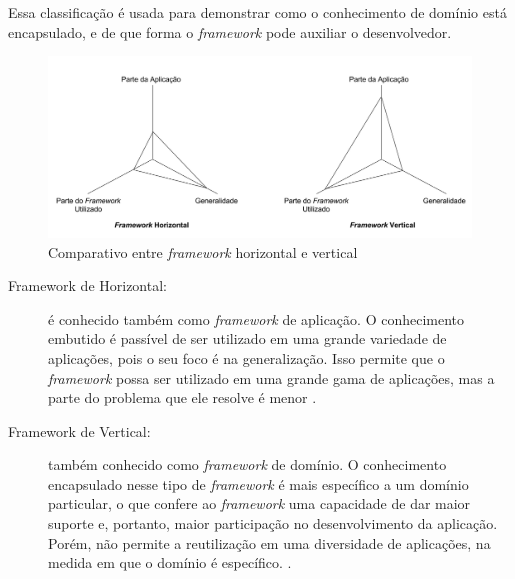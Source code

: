 Essa classificação é usada para demonstrar como o conhecimento de domínio está
encapsulado, e de que forma o \textit{framework} pode auxiliar o desenvolvedor.
\begin{figure}[h]
    \centering
    \includegraphics[width=\textwidth]{figuras/frameworkhorizontalvertical.png}
    \caption{Comparativo entre \textit{framework} horizontal e vertical}
    \label{fig:frameworkhorizontalvertical}
  \end{figure}
\par
\begin{description}
\item[Framework de Horizontal:] é conhecido também como \textit{framework} de
aplicação. O conhecimento embutido é passível de ser utilizado em uma grande
variedade de aplicações, pois o seu foco é na generalização. Isso permite que o
\textit{framework} possa ser utilizado em uma grande gama de aplicações, mas a
parte do problema que ele resolve é menor \cite{barretoJunior2006}.
\item[Framework de Vertical:] também conhecido como \textit{framework} de domínio.
O conhecimento encapsulado nesse tipo de \textit{framework} é mais específico a
um domínio particular, o que confere ao \textit{framework} uma capacidade de dar
maior suporte e, portanto, maior participação no desenvolvimento da aplicação.
Porém, não permite a reutilização em uma diversidade de aplicações, na medida
em que o domínio é específico. \cite{barretoJunior2006}.
\end{description}

